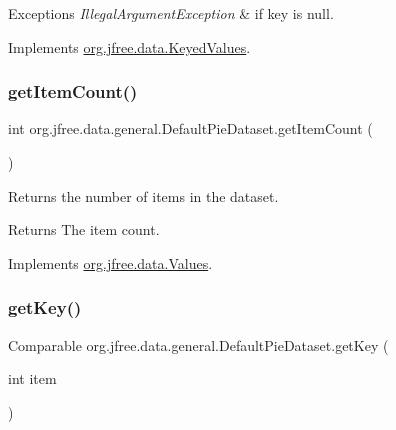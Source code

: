 \begin{DoxyExceptions}{Exceptions}
{\em Illegal\+Argument\+Exception} & if {\ttfamily key} is {\ttfamily null}. \\
\hline
\end{DoxyExceptions}


Implements \mbox{\hyperlink{interfaceorg_1_1jfree_1_1data_1_1_keyed_values_ae360fa76e98655c84180651f8e1395d7}{org.\+jfree.\+data.\+Keyed\+Values}}.

\mbox{\label{classorg_1_1jfree_1_1data_1_1general_1_1_default_pie_dataset_a4cf186a9f52bd58498c9f8551f0b5957}} 
\subsubsection{\texorpdfstring{get\+Item\+Count()}{getItemCount()}}
{\footnotesize\ttfamily int org.\+jfree.\+data.\+general.\+Default\+Pie\+Dataset.\+get\+Item\+Count (\begin{DoxyParamCaption}{ }\end{DoxyParamCaption})}

Returns the number of items in the dataset.

\begin{DoxyReturn}{Returns}
The item count. 
\end{DoxyReturn}


Implements \mbox{\hyperlink{interfaceorg_1_1jfree_1_1data_1_1_values_afd00781dbc2e351b7a77aca9a91ca0a9}{org.\+jfree.\+data.\+Values}}.

\mbox{\label{classorg_1_1jfree_1_1data_1_1general_1_1_default_pie_dataset_afafc2cf6169c3cc0af9c9422023f1b19}} 
\subsubsection{\texorpdfstring{get\+Key()}{getKey()}}
{\footnotesize\ttfamily Comparable org.\+jfree.\+data.\+general.\+Default\+Pie\+Dataset.\+get\+Key (\begin{DoxyParamCaption}\item[{int}]{item }\end{DoxyParamCaption})}


